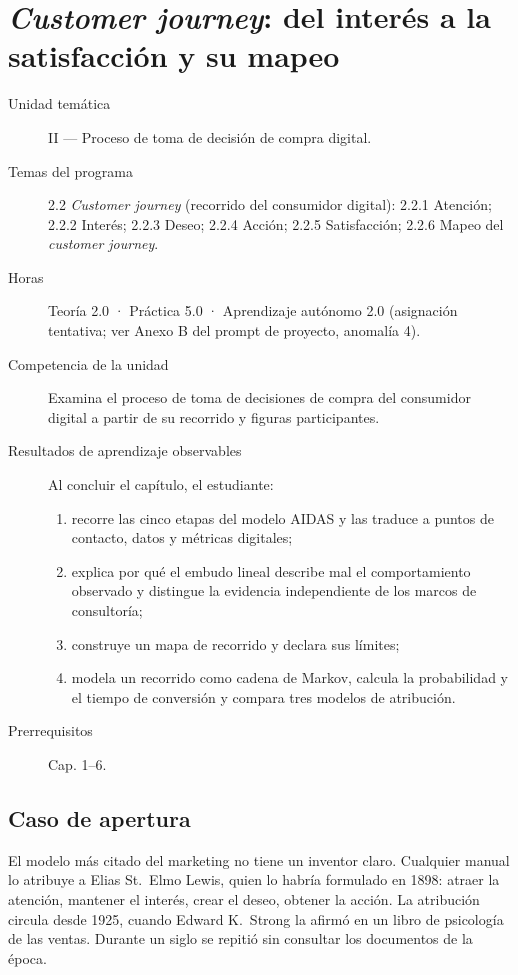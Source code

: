 \chapter{\textit{Customer journey}: del interés a la satisfacción y su mapeo}
\label{cap:07}

\begin{cajaFicha}
\begin{description}
  \item[Unidad temática] II — Proceso de toma de decisión de compra digital.
  \item[Temas del programa] 2.2 \textit{Customer journey} (recorrido del consumidor digital): 2.2.1 Atención; 2.2.2 Interés; 2.2.3 Deseo; 2.2.4 Acción; 2.2.5 Satisfacción; 2.2.6 Mapeo del \textit{customer journey}.
  \item[Horas] Teoría 2.0 · Práctica 5.0 · Aprendizaje autónomo 2.0 (asignación tentativa; ver Anexo B del prompt de proyecto, anomalía 4).
  \item[Competencia de la unidad] Examina el proceso de toma de decisiones de compra del consumidor digital a partir de su recorrido y figuras participantes.
  \item[Resultados de aprendizaje observables] Al concluir el capítulo, el estudiante:
  \begin{enumerate}
    \item recorre las cinco etapas del modelo AIDAS y las traduce a puntos de contacto, datos y métricas digitales;
    \item explica por qué el embudo lineal describe mal el comportamiento observado y distingue la evidencia independiente de los marcos de consultoría;
    \item construye un mapa de recorrido y declara sus límites;
    \item modela un recorrido como cadena de Markov, calcula la probabilidad y el tiempo de conversión y compara tres modelos de atribución.
  \end{enumerate}
  \item[Prerrequisitos] Cap. 1--6.
\end{description}
\end{cajaFicha}

\section{Caso de apertura}

El modelo más citado del marketing no tiene un inventor claro. Cualquier
manual lo atribuye a Elias St.\ Elmo Lewis, quien lo habría formulado en 1898:
atraer la atención, mantener el interés, crear el deseo, obtener la acción. La
atribución circula desde 1925, cuando Edward K.\ Strong la afirmó en un libro
de psicología de las ventas. Durante un siglo se repitió sin consultar los
documentos de la época.

